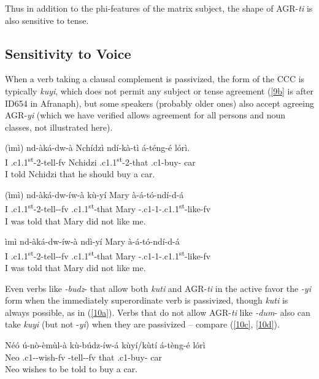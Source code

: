 \documentclass[output=paper,
modfonts
]{langscibook}
\begin{document}
Thus in addition to the phi-features of the matrix subject, the shape of AGR-\textit{ti} is also sensitive to tense.

\subsection{Sensitivity to Voice}

When a verb taking a clausal complement is passivized, the form of the CCC is typically \textit{kuyi}, which does not permit any subject or tense agreement (\ref{9b} is after ID654 in Afranaph), but some speakers (probably older ones) also accept agreeing AGR-\textit{yi} (which we have verified allows agreement for all persons and noun classes, not illustrated here).

\ea  
\ea \label{9a} \gll	(ìmì) nd-àká-dw-à Nchídzì ndí-kà-tì á-téng-é lórì.\\
	I .c1.1\textsuperscript{st}-2-tell-fv Nchidzi .c1.1\textsuperscript{st}-2-that .c1-buy-	car\\
	\glt I told Nchidzi that he should buy a car.

\ex \label{9b} \gll (ìmì) nd-àká-dw-íw-à   kù-yí     Mary à-á-tó-ndí-d-á\\
     	 I  .c1.1\textsuperscript{st}-2-tell--fv .c1.1\textsuperscript{st}-that Mary
         -.c1-1-.c1.1\textsuperscript{st}-like-fv\\
     \glt I was told that Mary did not like me.

\ex \label{9c} \gll ìmì nd-àká-dw-íw-à  ndì-yí Mary à-á-tó-ndí-d-á\\
         I .c1.1\textsuperscript{st}-2-tell--fv .c1.1\textsuperscript{st}-that Mary
         -.c1-1-.c1.1\textsuperscript{st}-like-fv\\
      	\glt I was told that Mary did not like me.	
\z \z

Even verbs like \textit{-budz}- that allow both \textit{kuti} and AGR-\textit{ti} in the active favor the \textit{-yi} form when the immediately superordinate verb is passivized, though \textit{kuti} is always possible, as in (\ref{10a}).  Verbs that do not allow AGR-\textit{ti} like \textit{-dum}- also can take \textit{kuyi} (but not -\textit{yi})  when they are passivized -- compare (\ref{10c}, \ref{10d}).

\ea
\ea \label{10a} \gll Néó ú-nò-èmùl-à kù-búdz-íw-á kùyí/kùtí	á-tèng-é lórì\\
	Neo	.c1--wish-fv	-tell--fv	that	.c1-buy-	car\\
	\glt Neo wishes to be told to buy a car. 
\end{document}
